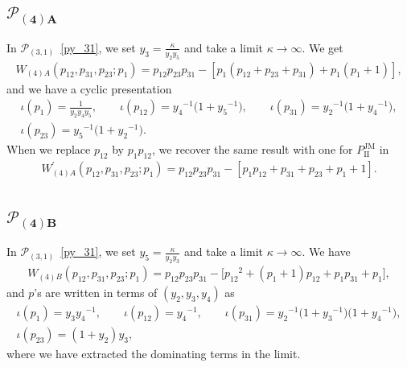 \documentclass[10pt,a4paper]{amsart}
\numberwithin{equation}{section}
\begin{document}
\subsection[$\mathcal{P}_{(4)A}$]{$\boldsymbol{\mathcal{P}_{(4)A}}$}
In $\mathcal{P}_{(3,1)}$~\eqref{py_31}, we set $ y_3 = \frac{\kappa}{y_2 y_5}$ and take a limit $\kappa \to \infty$. We get
\begin{gather} \label{W_4A}
 W_{(4)A}(p_{12}, p_{31}, p_{23}; p_1) = p_{12} p_{23} p_{31} - [ p_1 ( p_{12} + p_{23} + p_{31} ) + p_1 ( p_1 + 1 ) ],
\end{gather}
and we have a cyclic presentation
\begin{gather}
 \iota(p_1) = \frac{1}{y_2 y_4 y_5},\qquad \iota(p_{12}) ={y_4}^{-1} \big( 1+{y_5}^{-1} \big) , \qquad \iota( p_{31}) = {y_2}^{-1} \big( 1 +{y_4}^{-1} \big) , \nonumber\\
 \iota(p_{23}) = {y_5}^{-1} \big( 1 + {y_2}^{-1} \big) . \label{py_4A}
\end{gather}
When we replace $p_{12}$ by $ p_1 p_{12}$, we recover the same result with one for $P_{\mathrm{II}}^{\text{JM}}$ in~\cite{vdPutSaito09a}
\begin{gather*}%
 {W}^\prime_{(4)A}( p_{12}, p_{31}, p_{23} ; p_1 ) = p_{12} p_{23} p_{31} - [ p_1 p_{12}+p_{31} + p_{23}+ p_1 +1 ] .
\end{gather*}

\subsection[$\mathcal{P}_{(4)B}$]{$\boldsymbol{\mathcal{P}_{(4)B}}$}
In $\mathcal{P}_{(3,1)}$~\eqref{py_31}, we set $ y_5 = \frac{\kappa}{y_2 y_3}$ and take a limit $\kappa\to \infty$. We have
\begin{gather} \label{W_4B}
 W_{(4)B}(p_{12}, p_{31}, p_{23}; p_1) = p_{12} p_{23} p_{31} - \big[ {p_{12}}^2 + ( p_1+1 ) p_{12} + p_1 p_{31} +p_1 \big],
\end{gather}
and $p$'s are written in terms of $(y_2, y_3, y_4)$ as
\begin{gather*}
 \iota(p_1) = y_3 {y_4}^{-1},\qquad \iota(p_{12}) = {y_4}^{-1} , \qquad \iota(p_{31}) = {y_2}^{-1} \big(1+{y_3}^{-1}\big) \big(1+{y_4}^{-1}\big) , \\
 \iota(p_{23}) = ( 1+ y_2 ) y_3 ,
\end{gather*}
where we have extracted the dominating terms in the limit.
\end{document}
